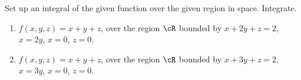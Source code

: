 Set up an integral of the given function over the given region in space. Integrate.
\begin{enumerate}
\item $f(x,y,z)=x+y+z$, over the region $\cR$ bounded by $ x + 2y+z=2$, $x=2y$, $x=0$, $z=0$.
\item $f(x,y,z)=x+y+z$, over the region $\cR$ bounded by $ x + 3y+z=2$, $x=3y$, $x=0$, $z=0$.
\end{enumerate}

